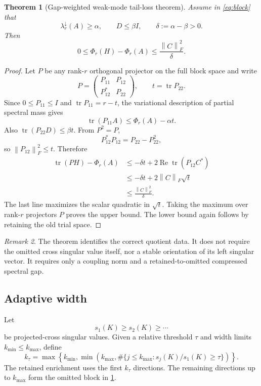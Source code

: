 \documentclass[11pt]{article}
\newtheorem{theorem}{Theorem}[section]
\theoremstyle{definition}
\theoremstyle{remark}
\newtheorem{remark}[theorem]{Remark}
\newcommand{\norm}[1]{\left\lVert#1\right\rVert}
\newcommand{\tr}{\operatorname{tr}}
\begin{document}
\begin{theorem}[Gap-weighted weak-mode tail-loss theorem]
\label{thm:gap}
Assume in \eqref{eq:block} that
\[
 \lambda_r^\downarrow(A)\ge\alpha,\qquad D\le\beta I,
 \qquad \delta:=\alpha-\beta>0.
\]
Then
\begin{equation}
 0\le\Phi_r(H)-\Phi_r(A)
 \le\frac{\norm C_F^2}{\delta}.
 \label{eq:gap-bound}
\end{equation}
\end{theorem}

\begin{proof}
Let $P$ be any rank-$r$ orthogonal projector on the full block space and
write
\[
 P=\begin{pmatrix}P_{11}&P_{12}\\P_{12}^*&P_{22}\end{pmatrix},
 \qquad t=\tr P_{22}.
\]
Since $0\le P_{11}\le I$ and $\tr P_{11}=r-t$, the variational description of
partial spectral mass gives
\begin{equation}
 \tr(P_{11}A)\le\Phi_r(A)-\alpha t.
 \label{eq:a-mass}
\end{equation}
Also $\tr(P_{22}D)\le\beta t$.  From $P^2=P$,
\[
 P_{12}^*P_{12}=P_{22}-P_{22}^2,
\]
so $\norm{P_{12}}_F^2\le t$.  Therefore
\begin{align*}
 \tr(PH)-\Phi_r(A)
 &\le-\delta t+2\operatorname{Re}\tr(P_{12}C^*)\\
 &\le-\delta t+2\norm C_F\sqrt t\\
 &\le\frac{\norm C_F^2}{\delta}.
\end{align*}
The last line maximizes the scalar quadratic in $\sqrt t$.  Taking the maximum
over rank-$r$ projectors $P$ proves the upper bound.  The lower bound again
follows by retaining the old trial space.
\end{proof}

\begin{remark}
The theorem identifies the correct quotient data.  It does not require the
omitted cross singular value itself, nor a stable orientation of its left
singular vector.  It requires only a coupling norm and a retained-to-omitted
compressed spectral gap.
\end{remark}

\subsection{Adaptive width}

Let
\[
 s_1(K)\ge s_2(K)\ge\cdots
\]
be projected-cross singular values.  Given a relative threshold $\tau$ and
width limits $k_{\min}\le k_{\max}$, define
\begin{equation}
 k_\tau
 =\max\left\{k_{\min},
 \min\left(k_{\max},
 \#\{j\le k_{\max}:s_j(K)/s_1(K)\ge\tau\}\right)\right\}.
 \label{eq:adaptive}
\end{equation}
The retained enrichment uses the first $k_\tau$ directions.  The remaining
directions up to $k_{\max}$ form the omitted block in
\cref{thm:gap}.
\end{document}
